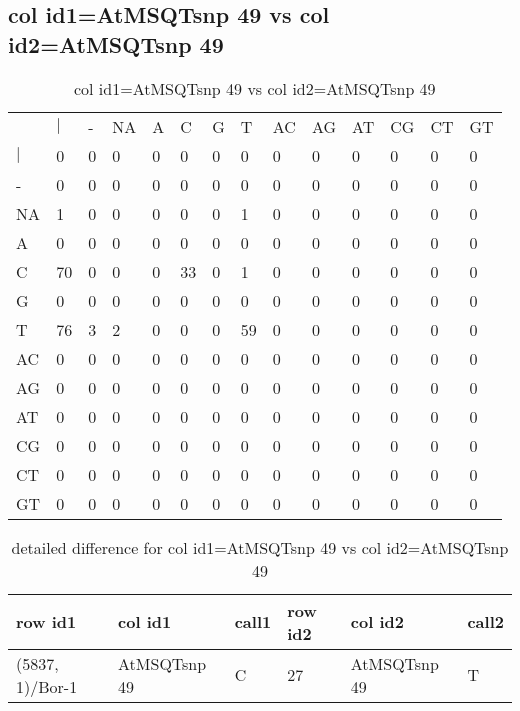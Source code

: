 \subsection{col id1=AtMSQTsnp 49 vs col id2=AtMSQTsnp 49}
\begin{center}
\begin{longtable}{|l|l|l|l|l|l|l|l|l|l|l|l|l|l|}
\caption{col id1=AtMSQTsnp 49 vs col id2=AtMSQTsnp 49} \label{table_dm746}\\
\hline
\\
\hline
&$|$&-&NA&A&C&G&T&AC&AG&AT&CG&CT&GT\\
$|$&0&0&0&0&0&0&0&0&0&0&0&0&0\\
-&0&0&0&0&0&0&0&0&0&0&0&0&0\\
NA&1&0&0&0&0&0&1&0&0&0&0&0&0\\
A&0&0&0&0&0&0&0&0&0&0&0&0&0\\
C&70&0&0&0&33&0&1&0&0&0&0&0&0\\
G&0&0&0&0&0&0&0&0&0&0&0&0&0\\
T&76&3&2&0&0&0&59&0&0&0&0&0&0\\
AC&0&0&0&0&0&0&0&0&0&0&0&0&0\\
AG&0&0&0&0&0&0&0&0&0&0&0&0&0\\
AT&0&0&0&0&0&0&0&0&0&0&0&0&0\\
CG&0&0&0&0&0&0&0&0&0&0&0&0&0\\
CT&0&0&0&0&0&0&0&0&0&0&0&0&0\\
GT&0&0&0&0&0&0&0&0&0&0&0&0&0\\
\hline
\end{longtable}
\end{center}

\begin{center}
\begin{longtable}{|l|l|l|l|l|l|}
\caption{detailed difference for col id1=AtMSQTsnp 49 vs col id2=AtMSQTsnp 49} \label{table_dm747}\\
\hline
row id1&col id1&call1&row id2&col id2&call2\\
\hline
(5837, 1)/Bor-1&AtMSQTsnp 49&C&27&AtMSQTsnp 49&T\\
\hline
\end{longtable}
\end{center}


